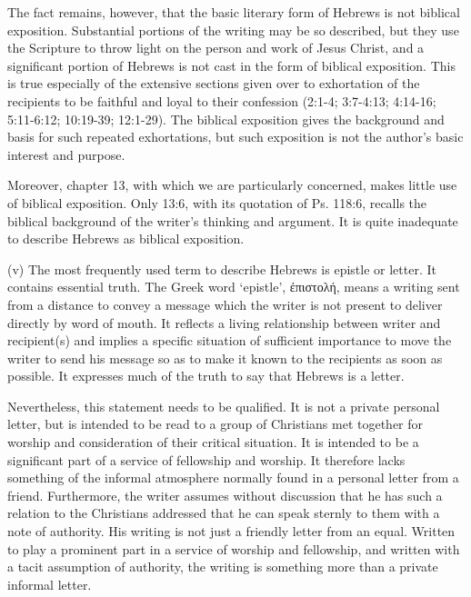 The fact remains, however, that the basic literary form of Hebrews is not
biblical exposition.
Substantial portions of the writing may be so described, but they use the
Scripture to throw light on the person and work of Jesus Christ, and a
significant portion of Hebrews is not cast in the form of biblical exposition.
This is true especially of the extensive sections given over to exhortation of
the recipients to be faithful and loyal to their confession (2:1-4; 3:7-4:13;
4:14-16; 5:11-6:12; 10:19-39; 12:1-29).
The biblical exposition gives the background and basis for such repeated
exhortations, but such exposition is not the author's basic interest and
purpose.
\newline

Moreover, chapter 13, with which we are particularly concerned, makes little use
of biblical exposition.
Only 13:6, with its quotation of Ps. 118:6, recalls the biblical background of
the writer's thinking and argument.
It is quite inadequate to describe Hebrews as biblical exposition.
\newline

(v) The most frequently used term to describe Hebrews is epistle or letter.
It contains essential truth.
The Greek word `epistle', ἐπιστολή, means a writing sent from a distance to
convey a message which the writer is not present to deliver directly by word of
mouth.
It reflects a living relationship between writer and recipient(s) and implies a
specific situation of sufficient importance to move the writer to send his
message so as to make it known to the recipients as soon as possible.
It expresses much of the truth to say that Hebrews is a letter.
\newline

Nevertheless, this statement needs to be qualified.
It is not a private personal letter, but is intended to be read to a group of
Christians met together for worship and consideration of their critical
situation.
It is intended to be a significant part of a service of fellowship and worship.
It therefore lacks something of the informal atmosphere normally found in a
personal letter from a friend.
Furthermore, the writer assumes without discussion that he has such a relation
to the Christians addressed that he can speak sternly to them with a note of
authority.
His writing is not just a friendly letter from an equal.
Written to play a prominent part in a service of worship and fellowship, and
written with a tacit assumption of authority, the writing is something more than
a private informal letter.
\newline

